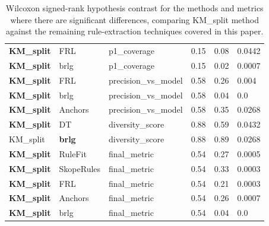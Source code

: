 \begin{table}[h!]
{\begin{tabular}{@{}llllll@{}}
\textbf{KM\_split} & FRL           & p1\_coverage         & 0.15    & 0.08    & 0.0442 \\
\textbf{KM\_split} & brlg          & p1\_coverage         & 0.15    & 0.02    & 0.0007 \\
\textbf{KM\_split} & FRL           & precision\_vs\_model & 0.58    & 0.26    & 0.004  \\
\textbf{KM\_split} & brlg          & precision\_vs\_model & 0.58    & 0.04    & 0.0    \\
\textbf{KM\_split} & Anchors       & precision\_vs\_model & 0.58    & 0.35    & 0.0268 \\
\textbf{KM\_split} & DT            & diversity\_score     & 0.88    & 0.59    & 0.0432 \\
KM\_split          & \textbf{brlg} & diversity\_score     & 0.88    & 0.89    & 0.0268 \\
\textbf{KM\_split} & RuleFit       & final\_metric        & 0.54    & 0.27    & 0.0005 \\
\textbf{KM\_split} & SkopeRules    & final\_metric        & 0.54    & 0.33    & 0.0003 \\
\textbf{KM\_split} & FRL           & final\_metric        & 0.54    & 0.21    & 0.0003 \\
\textbf{KM\_split} & Anchors       & final\_metric        & 0.54    & 0.26    & 0.0007 \\
\textbf{KM\_split} & brlg          & final\_metric        & 0.54    & 0.04    & 0.0 \\
\bottomrule
\end{tabular}%
}
\caption{Wilcoxon signed-rank hypothesis contrast for the methods and metrics where there are significant differences, comparing KM\_split method against the remaining rule-extraction techniques covered in this paper.}
\label{table:annex-rule-extraction-xai-metrics-H3}
\end{table}


